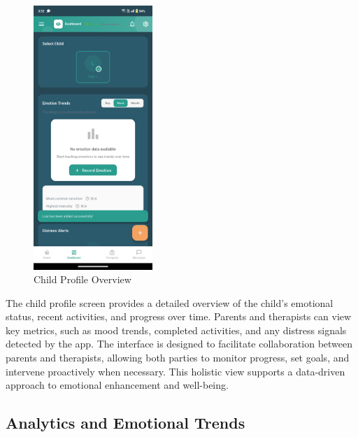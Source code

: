 ﻿\documentclass[12pt,a4paper]{article}
\newcommand{\sectiontitle}[1]{\subsection{#1}}
\begin{document}
\begin{figure}[H]
    \centering
    \includegraphics[width=0.4\textwidth]{Screenshots/childprofile.png}
    \caption{Child Profile Overview}
    \label{fig:child-profile}
\end{figure}
The child profile screen provides a detailed overview of the child's emotional status, recent activities, and progress over time. Parents and therapists can view key metrics, such as mood trends, completed activities, and any distress signals detected by the app. The interface is designed to facilitate collaboration between parents and therapists, allowing both parties to monitor progress, set goals, and intervene proactively when necessary. This holistic view supports a data-driven approach to emotional enhancement and well-being.

\sectiontitle{Analytics and Emotional Trends}
\end{document}
